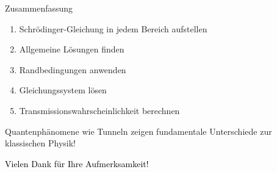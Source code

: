 \documentclass{beamer}
\begin{document}
    \begin{frame}{Zusammenfassung}
        \begin{enumerate}
            \item Schrödinger-Gleichung in jedem Bereich aufstellen
            \item Allgemeine Lösungen finden
            \item Randbedingungen anwenden
            \item Gleichungssystem lösen
            \item Transmissionswahrscheinlichkeit berechnen
        \end{enumerate}

        Quantenphänomene wie Tunneln zeigen fundamentale Unterschiede zur klassischen Physik!
    \end{frame}

    
    

    \begin{frame}
        \centering
        \Huge
        \textcolor{black}{Vielen Dank für Ihre Aufmerksamkeit!}
    \end{frame}
\end{document}
